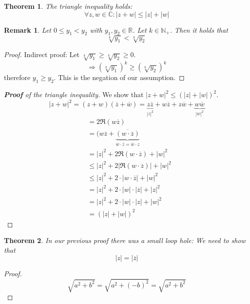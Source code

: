 \documentclass[a4paper,landscape,twocolumn]{article}
\newtheorem{theorem}{Theorem}
\newtheorem{rem}{Remark}
\newcommand\abs[1]{\left|#1\right|}
\begin{document}
\begin{theorem}
  The triangle inequality holds:
  \[ \forall z, w \in \mathbb C: \abs{z + w} \leq \abs{z} + \abs{w} \]
\end{theorem}

\begin{rem}
  Let $0 \leq y_1 < y_2$ with $y_1, y_2 \in \mathbb R$.
  Let $k \in \mathbb N_+$. Then it holds that
  \[ \sqrt[k]{y_1} < \sqrt[k]{y_2} \]
\end{rem}

\begin{proof}
  Indirect proof: Let $\sqrt[k]{y_1} \geq \sqrt[k]{y_2} \geq 0$.
  \[ \Rightarrow \left(\sqrt[k]{y_1}\right)^k \geq \left(\sqrt[k]{y_2}\right)^k \]
  therefore $y_1 \geq y_2$. This is the negation of our assumption.
\end{proof}

\begin{proof}[\textbf{Proof} of the triangle inequality]
  We show that $\abs{z + w}^2 \leq \left(\abs{z} + \abs{w}\right)^2$.
  \[
      \abs{z + w}^2 = (z + w)(\overline z + \overline w)
      = \underbrace{z \overline z}_{\abs{z}^2} + w \overline z
      + z \overline w + \underbrace{w \overline w}_{\abs{w}^2}
  \]
  \begin{align*}
      &= 2 \Re{(w \overline{z})} \\
      &= (w \overline{z} + \underbrace{\overline{(w \cdot \overline z)}}_{\overline w \cdot \overline z = \overline w \cdot z} \\
      &= \abs{z}^2 + 2\Re{(w \cdot \overline z)} + \abs{w}^2 \\
      &\leq \abs{z}^2 + 2\abs{\Re{(w \cdot \overline z)}} + \abs{w}^2 \\
      &\leq \abs{z}^2 + 2 \cdot \abs{w \cdot \overline{z}} + \abs{w}^2 \\
      &= \abs{z}^2 + 2 \cdot \abs{w} \cdot \abs{\overline{z}} + \abs{z}^2 \\
      &= \abs{z}^2 + 2 \cdot \abs{w} \cdot \abs{z} + \abs{w}^2 \\
      &= \left(\abs{z} + \abs{w}\right)^2
  \end{align*}
\end{proof}

\begin{theorem}
  In our previous proof there was a small loop hole: We need to show that
  \[ \abs{z} = \abs{\overline z} \]
\end{theorem}

\begin{proof}
  \[ \sqrt{a^2 + b^2} = \sqrt{a^2 + (-b)^2} = \sqrt{a^2 + b^2} \]
\end{proof}
\end{document}
